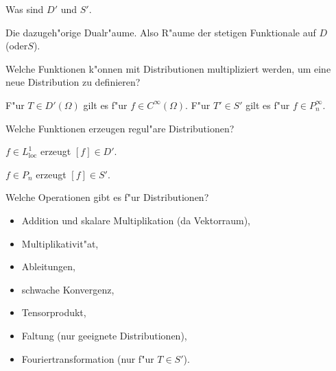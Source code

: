 \documentclass[9pt]{article}
\newenvironment{field}{}{\newpage}
\newif\ifnote
\newenvironment{note}{\notetrue}{\notefalse}
\newcommand{\localtag}{}
\newcommand{\globaltag}{}
\newcommand{\uuid}{}
\newcommand{\tags}[1]{
    \ifnote 
        \renewcommand{\localtag}{#1}
    \else
        \renewcommand{\globaltag}{#1}
    \fi 
    }
\newcommand{\xplain}[1]{\renewcommand{\uuid}{#1}}
\begin{document}
				\begin{note}
					\xplain{9d3022eb-bcb3-4ebd-9d9a-e47e352b6adc}
					\tags{}
					
					\begin{field}  %
						Was sind $D'$ und $S'$.
					\end{field}
					
					\begin{field}  %
						Die dazugeh"orige Dualr"aume. Also R"aume der stetigen Funktionale auf $D$ (oder$S$).
					\end{field}
						
					\begin{field}  %
						Welche Funktionen k"onnen mit Distributionen multipliziert werden, um eine
						neue Distribution zu definieren?
					\end{field}
					
					\begin{field}  %
						F"ur $T\in D'(\Omega)$ gilt es f"ur  $f\in C^\infty(\Omega)$.
						F"ur $T'\in S'$ gilt es f"ur  $f\in P^\infty_n$.
					\end{field}
						
					\begin{field}  %
						Welche Funktionen erzeugen regul"are Distributionen? 
					\end{field}
					
					\begin{field}  %
						$f\in L^1_{\text{loc}}$ erzeugt $[f]\in D'$.
						
						$f \in P_n$ erzeugt $[f] \in S'$.
					\end{field}
						
					\begin{field}  %
						Welche Operationen gibt es f"ur Distributionen?
					\end{field}
					
					\begin{field}  %
						\begin{itemize}
							\item Addition und skalare Multiplikation (da Vektorraum),
							\item Multiplikativit"at,
							\item Ableitungen,
							\item schwache Konvergenz,
							\item Tensorprodukt,
							\item Faltung (nur geeignete Distributionen),
							\item Fouriertransformation (nur f"ur $T\in S'$).
						\end{itemize}
					\end{field}
						

\end{note}
\end{document}
